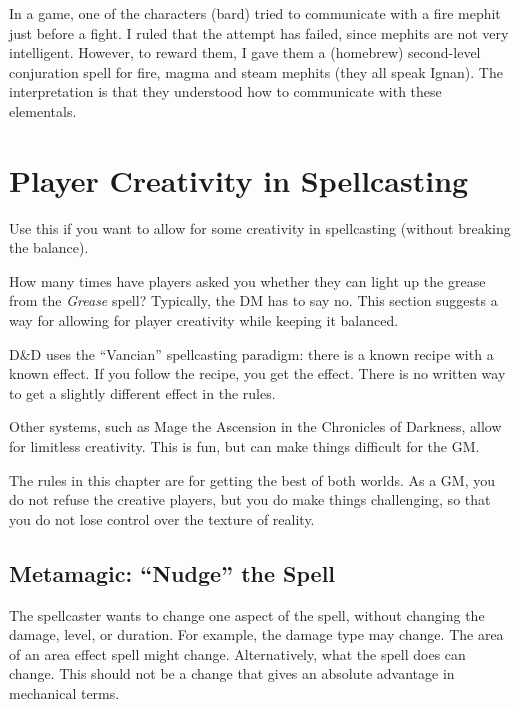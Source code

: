 \documentclass[twocolumn]{dndbook}
\begin{document}
In a game, one of the characters (bard) tried to communicate with a fire mephit just before a fight.
I ruled that the attempt has failed, since mephits are not very intelligent.
However, to reward them, I gave them a (homebrew) second-level conjuration spell for fire, magma and steam mephits (they all speak Ignan).
The interpretation is that they understood how to communicate with these elementals.\par

\section{Player Creativity in Spellcasting}

\begin{emphasisParagraph}
	Use this if you want to allow for some creativity in spellcasting (without breaking the balance).
\end{emphasisParagraph}

\begin{emphasisParagraph}
	How many times have players asked you whether they can light up the grease from the \emph{Grease} spell?
	Typically, the DM has to say no. This section suggests a way for allowing for player creativity while keeping it balanced.
\end{emphasisParagraph}

D\&D uses the ``Vancian'' spellcasting paradigm: there is a known recipe with a known effect.
If you follow the recipe, you get the effect.
There is no written way to get a slightly different effect in the rules.\par

Other systems, such as Mage the Ascension in the Chronicles of Darkness, allow for limitless creativity.
This is fun, but can make things difficult for the GM.\par

The rules in this chapter are for getting the best of both worlds.
As a GM, you do not refuse the creative players, but you do make things challenging, so that you do not lose control over the texture of reality.

\subsection{Metamagic: ``Nudge'' the Spell}

The spellcaster wants to change one aspect of the spell, without changing the damage, level, or duration.
For example, the damage type may change.
The area of an area effect spell might change.
Alternatively, what the spell does can change.
This should not be a change that gives an absolute advantage in mechanical terms.\par
\end{document}
